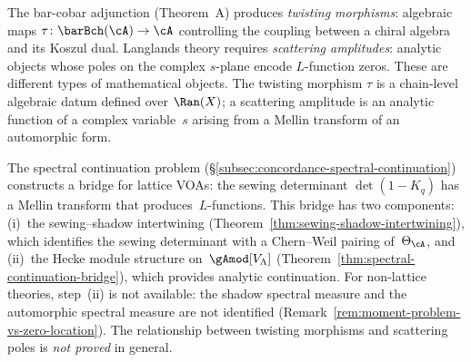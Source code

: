 \begin{remark}%
\label{rem:langlands-gap-a}%
%
%
\ClaimStatusConditional{}
The bar-cobar adjunction (Theorem~A) produces
\emph{twisting morphisms}: algebraic maps
$\tau \colon \barBch(\cA) \to \cA$ controlling the
coupling between a chiral algebra and its Koszul dual.
Langlands theory requires \emph{scattering
amplitudes}: analytic objects whose poles on the complex
$s$-plane encode $L$-function zeros. These are different
types of mathematical objects. The twisting morphism
$\tau$ is a chain-level algebraic datum defined over
$\Ran(X)$; a scattering amplitude is an analytic function
of a complex variable~$s$ arising from a Mellin transform
of an automorphic form.

The spectral continuation problem
(\S\ref{subsec:concordance-spectral-continuation})
constructs a bridge for lattice VOAs: the sewing
determinant $\det(1 - K_q)$ has a Mellin transform
that produces~$L$-functions. This bridge has two
components: (i)~the sewing--shadow intertwining
(Theorem~\ref{thm:sewing-shadow-intertwining}), which
identifies the sewing determinant with a Chern--Weil
pairing of~$\Theta_\cA$, and (ii)~the Hecke module
structure on~$\gAmod[V_\Lambda]$
(Theorem~\ref{thm:spectral-continuation-bridge}), which
provides analytic continuation. For non-lattice theories,
step~(ii) is not available: the shadow spectral measure
and the automorphic spectral measure are not identified
(Remark~\ref{rem:moment-problem-vs-zero-location}).
The relationship between twisting morphisms and
scattering poles is \emph{not proved} in general.
\end{remark}

